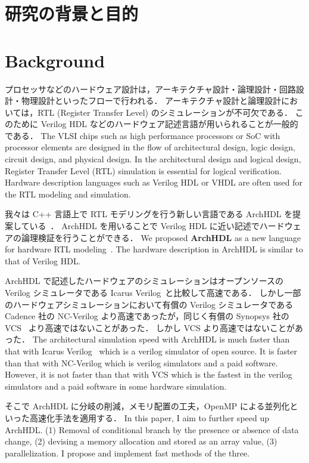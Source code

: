 \section{研究の背景と目的}
\fi
\section{Background}

プロセッサなどのハードウェア設計は，アーキテクチャ設計・論理設計・回路設計・物理設計といったフローで行われる．
アーキテクチャ設計と論理設計においては，RTL (Register Transfer Level) のシミュレーションが不可欠である．
このために Verilog HDL などのハードウェア記述言語が用いられることが一般的である．
\fi
The VLSI chips such as high performance processors or SoC with processor elements are designed in the flow of architectural design,
logic design, circuit design, and physical design.
In the architectural design and logical design, Register Transfer Level (RTL) simulation is essential for logical verification.
Hardware description languages such as Verilog HDL or VHDL are often used for the RTL modeling and simulation.

我々は C++ 言語上で RTL モデリングを行う新しい言語である ArchHDL を提案している~\cite{satos:archhdl}．
ArchHDL を用いることで Verilog HDL に近い記述でハードウェアの論理検証を行うことができる．
\fi
We proposed \textbf{ArchHDL} as a new language for hardware RTL modeling~\cite{satos:archhdl}.
The hardware description in ArchHDL is similar to that of Verilog HDL.

ArchHDL で記述したハードウェアのシミュレーションはオープンソースの Verilog シミュレータである Icarus Verilog~\cite{iverilog}と比較して高速である．
しかし一部のハードウェアシミュレーションにおいて有償の Verilog シミュレータである Cadence 社の NC-Verilog より高速であったが，同じく有償の Synopsys 社の VCS~\cite{vcs} より高速ではないことがあった．
しかし VCS より高速ではないことがあった．
\fi
The architectural simulation speed with ArchHDL is much faster than
that with Icarus Verilog~\cite{iverilog} which is a verilog simulator of open source.
It is faster than that with NC-Verilog which is verilog simulators and a paid software.
However, it is not faster than that with VCS which is the fastest in the verilog simulators and a paid software in some hardware simulation.

そこで ArchHDL に分岐の削減，メモリ配置の工夫，OpenMP による並列化といった高速化手法を適用する．
\fi
In this paper, I aim to further speed up ArchHDL.
(1) Removal of conditional branch by the presence or absence of data change,
(2) devising a memory allocation and stored as an array value,
(3) parallelization.
I propose and implement fast methods of the three.

